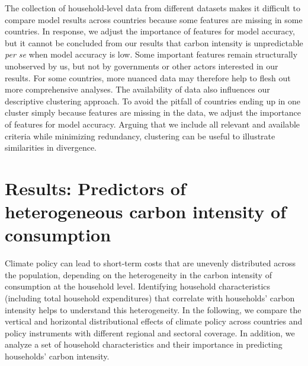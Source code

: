 \documentclass[12pt, a4paper]{article}
\begin{document}
The collection of household-level data from different datasets makes it difficult to compare model results across countries because some features are missing in some countries. In response, we adjust the importance of features for model accuracy, but it cannot be concluded from our results that carbon intensity is unpredictable \textit{per se} when model accuracy is low. Some important features remain structurally unobserved by us, but not by governments or other actors interested in our results. For some countries, more nuanced data may therefore help to flesh out more comprehensive analyses. The availability of data also influences our descriptive clustering approach. To avoid the pitfall of countries ending up in one cluster simply because features are missing in the data, we adjust the importance of features for model accuracy. Arguing that we include all relevant and available criteria while minimizing redundancy, clustering can be useful to illustrate similarities in divergence.


\section{Results: Predictors of heterogeneous carbon intensity of consumption} \label{sec:results}

Climate policy can lead to short-term costs that are unevenly distributed across the population, depending on the heterogeneity in the carbon intensity of consumption at the household level. Identifying household characteristics (including total household expenditures) that correlate with households' carbon intensity helps to understand this heterogeneity. In the following, we compare the vertical and horizontal distributional effects of climate policy across countries and policy instruments with different regional and sectoral coverage. In addition, we analyze a set of household characteristics and their importance in predicting households' carbon intensity. %
\end{document}
